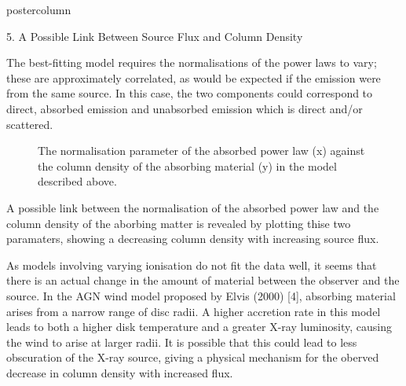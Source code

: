 \documentclass[final]{beamer}
\begin{document}
\begin{frame}
\begin{columns}
\begin{column}{.5\textwidth}
\begin{beamercolorbox}[center,wd=\textwidth]{postercolumn}
\begin{minipage}[T]{.97\textwidth}
{          \vspace{20pt}

          
 

	 \vspace{-20pt}
	    
         \begin{block}{5. A Possible Link Between Source Flux and Column Density} 
	
		The best-fitting model requires the normalisations of the power
              	laws to vary; these are approximately correlated, as would be 
              	expected if the emission were from the same source. In this case,
              	the two components could correspond to direct, absorbed emission
              	and unabsorbed emission which is direct and/or scattered. 
	
		\begin{figure}
			\caption{The normalisation parameter of the absorbed power law 
				(x) against the column density of the absorbing material (y) in
				the model described above.}
		\end{figure}  
				
		A possible link between the normalisation of the absorbed power law and the column density of the aborbing matter
		is revealed by plotting thise two paramaters, showing a decreasing column density with increasing source flux.
		
		
		
		\vspace{20pt} As models involving varying ionisation do not fit the data well, it seems that
		there is an actual change in the amount of material between the observer and the source.
		In the AGN wind model proposed by Elvis (2000) [4], absorbing material arises from a narrow
		range of disc radii. A higher accretion rate in this model leads to both a higher disk temperature and a greater
		X-ray luminosity, causing the wind to arise at larger radii. It is possible that this
		could lead to less obscuration of the X-ray source, giving a physical mechanism for the oberved decrease in column
		density with increased flux.


\end{block}}
\end{minipage}
\end{beamercolorbox}
\end{column}
\end{columns}
\end{frame}
\end{document}
